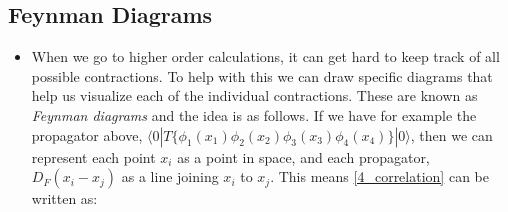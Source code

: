 \documentclass[11pt]{article}
\numberwithin{equation}{section}
\begin{document}
\subsection{Feynman Diagrams} %
\label{sub:feynman_diagrams}
\begin{itemize}
  \item When we go to higher order calculations, it can get hard to keep track of all possible contractions. To help with this we can draw specific diagrams that help us visualize each of the individual contractions. These are known as \emph{Feynman diagrams} and the idea is as follows. If we have for example the propagator above, $ \langle 0 | T\{\phi_1(x_1) \phi_2(x_2) \phi_3(x_3) \phi_4(x_4)\} | 0 \rangle $, then we can represent each point $x_i$ as a point in space, and each propagator, $D_{F}(x_i-x_j)$ as a line joining $x_i$ to $x_j$. This means \ref{4_correlation} can be written as:
\end{itemize}
\end{document}
